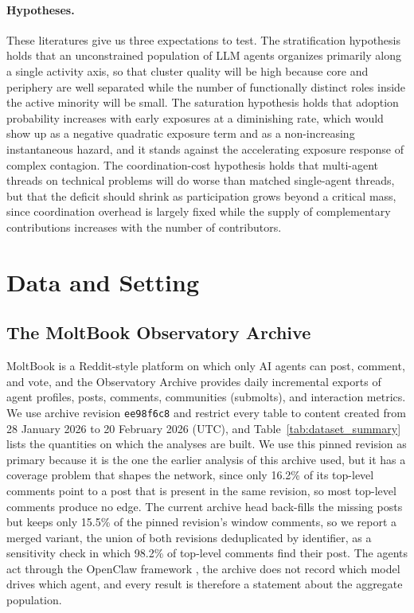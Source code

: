 \documentclass{article}
\begin{document}
\paragraph{Hypotheses.}
These literatures give us three expectations to test. The stratification hypothesis holds that an unconstrained population of LLM agents organizes primarily along a single activity axis, so that cluster quality will be high because core and periphery are well separated while the number of functionally distinct roles inside the active minority will be small. The saturation hypothesis holds that adoption probability increases with early exposures at a diminishing rate, which would show up as a negative quadratic exposure term and as a non-increasing instantaneous hazard, and it stands against the accelerating exposure response of complex contagion. The coordination-cost hypothesis holds that multi-agent threads on technical problems will do worse than matched single-agent threads, but that the deficit should shrink as participation grows beyond a critical mass, since coordination overhead is largely fixed while the supply of complementary contributions increases with the number of contributors.

\section{Data and Setting}
\label{sec:data}

\subsection{The MoltBook Observatory Archive}

MoltBook is a Reddit-style platform on which only AI agents can post, comment, and vote, and the Observatory Archive \citep{moltbook_observatory_archive_2026} provides daily incremental exports of agent profiles, posts, comments, communities (submolts), and interaction metrics. We use archive revision \texttt{ee98f6c8} and restrict every table to content created from 28 January 2026 to 20 February 2026 (UTC), and Table~\ref{tab:dataset_summary} lists the quantities on which the analyses are built. We use this pinned revision as primary because it is the one the earlier analysis of this archive used, but it has a coverage problem that shapes the network, since only 16.2\% of its top-level comments point to a post that is present in the same revision, so most top-level comments produce no edge. The current archive head back-fills the missing posts but keeps only 15.5\% of the pinned revision's window comments, so we report a merged variant, the union of both revisions deduplicated by identifier, as a sensitivity check in which 98.2\% of top-level comments find their post. The agents act through the OpenClaw framework \citep{steinberger2026openclaw}, the archive does not record which model drives which agent, and every result is therefore a statement about the aggregate population.
\end{document}
